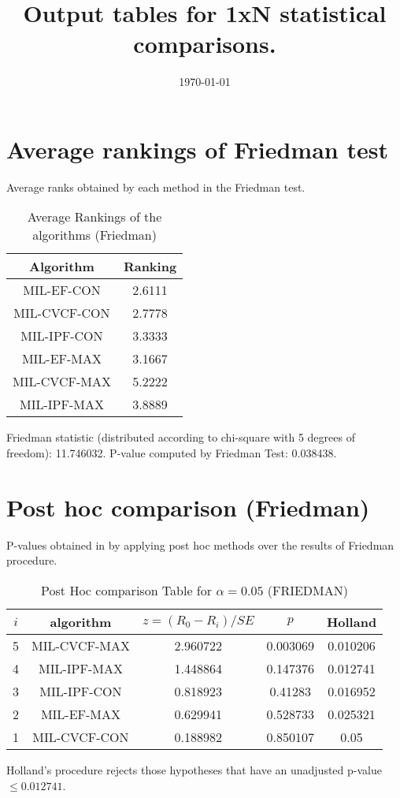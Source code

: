 \documentclass[a4paper,10pt]{article}
\title{Output tables for 1xN statistical comparisons.}
\author{}
\date{\today}
\begin{document}
\begin{landscape}
\pagestyle{empty}
\maketitle
\thispagestyle{empty}

\section{Average rankings of Friedman test}


Average ranks obtained by each method in the Friedman test.

\begin{table}[!htp]
\centering
\begin{tabular}{|c|c|}\hline
Algorithm&Ranking\\\hline
MIL-EF-CON&2.6111\\MIL-CVCF-CON&2.7778\\MIL-IPF-CON&3.3333\\MIL-EF-MAX&3.1667\\MIL-CVCF-MAX&5.2222\\MIL-IPF-MAX&3.8889\\\hline\end{tabular}
\caption{Average Rankings of the algorithms (Friedman)}
\end{table}

Friedman statistic (distributed according to chi-square with 5 degrees of freedom): 11.746032. \newline P-value computed by Friedman Test: 0.038438.\newline


\newpage

\section{Post hoc comparison (Friedman)}


P-values obtained in by applying post hoc methods over the results of Friedman procedure.

\begin{table}[!htp]
\centering\footnotesize
\begin{tabular}{ccccc}
$i$&algorithm&$z=(R_0 - R_i)/SE$&$p$&Holland\\
\hline5&MIL-CVCF-MAX&2.960722&0.003069&0.010206\\4&MIL-IPF-MAX&1.448864&0.147376&0.012741\\3&MIL-IPF-CON&0.818923&0.41283&0.016952\\2&MIL-EF-MAX&0.629941&0.528733&0.025321\\1&MIL-CVCF-CON&0.188982&0.850107&0.05\\\hline
\end{tabular}
\caption{Post Hoc comparison Table for $\alpha=0.05$ (FRIEDMAN)}
\end{table}Holland's procedure rejects those hypotheses that have an unadjusted p-value $\le0.012741$.



\end{landscape}
\end{document}
